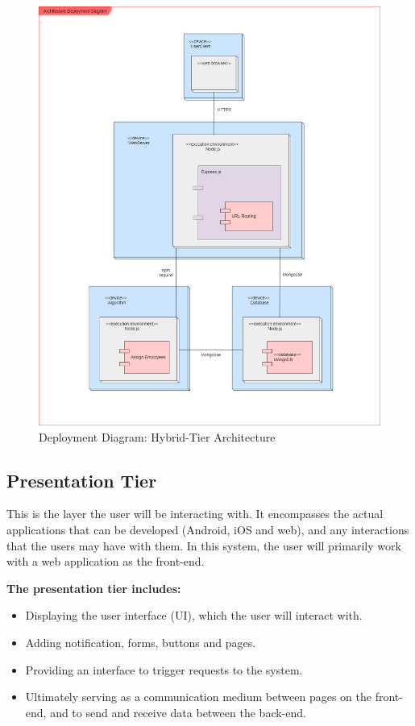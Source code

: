 \documentclass[a4paper,12pt]{article}
\begin{document}
\begin{adjustwidth}{2.5em}{0pt}
\begin{flushleft}
\begin{figure}[h]
				\includegraphics[width=0.5\linewidth]{Diagrams/deployment.png}
				\caption{Deployment Diagram: Hybrid-Tier Architecture}
				\label{fig:Deployment}
			\end{figure}
		\end{flushleft}
		
		\subsection{Presentation Tier}
		\begin{flushleft}
			This is the layer the user will be interacting with. It encompasses the actual applications that can be developed (Android, iOS and web), and any interactions that the users may have with them. In this system, the user will primarily work with a web application as the front-end.
			\newline 
			
			\textbf{The presentation tier includes:}
			\begin{itemize}
				\item Displaying the user interface (UI), which the user will interact with. 
				\item Adding notification, forms, buttons and pages. 
				\item Providing an interface to trigger requests to the system. 
				\item Ultimately serving as a communication medium between pages on the front-end, and to send and receive data between the back-end.
			\end{itemize}
		\end{flushleft}
		

\end{adjustwidth}
\end{document}

